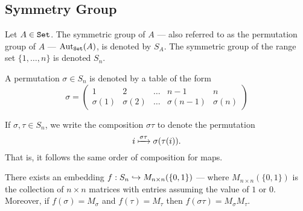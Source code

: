 \subsection{Symmetry Group}

\begin{definition}\label{def: sym-group}
Let \(A \in {\texttt{Set}}\). The symmetric group of \(A\) --- also referred to as the
permutation group of \(A\) --- \(\operatorname{Aut}_{\texttt{Set}}(A)\), is denoted by \(S_A\). The
symmetric group of the range set \(\{1, \dots, n\}\) is denoted \(S_n\).
\end{definition}

\begin{notation}[Permutations]
A permutation \(\sigma \in S_n\) is denoted by a table of the form
\[
  \sigma =
  \begin{pmatrix}
    1 &2 &\dots &n-1 &n \\
    \sigma(1) &\sigma(2) &\dots &\sigma(n-1) &\sigma(n)
  \end{pmatrix}
\]
\end{notation}

\begin{remark}[Convention]\label{rem: convention-perm}
If \(\sigma, \tau \in S_n\), we write the composition \(\sigma \tau\)
to denote the permutation
\[
  i \xmapsto{\sigma\tau} \sigma(\tau(i)).
\]
That is, it follows the same order of composition for maps.
\end{remark}

\begin{proposition}
There exists an embedding \(f: S_n \hookrightarrow M_{n \times n}(\{0, 1\})\)
--- where \(M_{n \times n}(\{0, 1\})\) is the collection of \(n \times n\)
matrices with entries assuming the value of \(1\) or \(0\). Moreover, if
\(f(\sigma) = M_\sigma\) and \(f(\tau) = M_\tau\) then \(f(\sigma \tau) =
M_\sigma M_\tau\).
\end{proposition}

